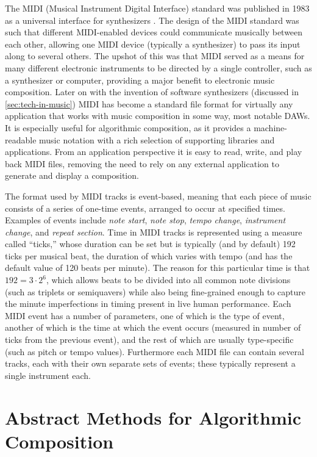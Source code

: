 \documentclass[ author={Stephen Livermore-Tozer},
				supervisor={Dr. Peter Flach},
				degree={MEng},
				title={Algorithmic Co-composition Using Machine Learning},
				subtitle={},
				type={research},
				year={2016} ]{dissertation}
\begin{document}
	The MIDI (Musical Instrument Digital Interface) standard was published in 1983 as a universal interface for synthesizers  \cite{swift1997brief}. The design of the MIDI standard was such that different MIDI-enabled devices could communicate musically between each other, allowing one MIDI device (typically a synthesizer) to pass its input along to several others. The upshot of this was that MIDI served as a means for many different electronic instruments to be directed by a single controller, such as a synthesizer or computer, providing a major benefit to electronic music composition. Later on with the invention of software synthesizers (discussed in \ref{sec:tech-in-music}) MIDI has become a standard file format for virtually any application that works with music composition in some way, most notable DAWs. It is especially useful for algorithmic composition, as it provides a machine-readable music notation with a rich selection of supporting libraries and applications. From an application perspective it is easy to read, write, and play back MIDI files, removing the need to rely on any external application to generate and display a composition. 
	
	
	The format used by MIDI tracks is event-based, meaning that each piece of music consists of a series of one-time events, arranged to occur at specified times. Examples of events include \textit{note start}, \textit{note stop}, \textit{tempo change}, \textit{instrument change}, and \textit{repeat section}. Time in MIDI tracks is represented using a measure called ``ticks,'' whose duration can be set but is typically (and by default) 192 ticks per musical beat, the duration of which varies with tempo (and has the default value of 120 beats per minute). The reason for this particular time is that $192 = 3 \cdot 2^6$, which allows beats to be divided into all common note divisions (such as triplets or semiquavers) while also being fine-grained enough to capture the minute imperfections in timing present in live human performance. Each MIDI event has a number of parameters, one of which is the type of event, another of which is the time at which the event occurs (measured in number of ticks from the previous event), and the rest of which are usually type-specific (such as pitch or tempo values). Furthermore each MIDI file can contain several tracks, each with their own separate sets of events; these typically represent a single instrument each. 
	
	\section{Abstract Methods for Algorithmic Composition}
	\label{sec:abstract-methods}
	
\end{document}
